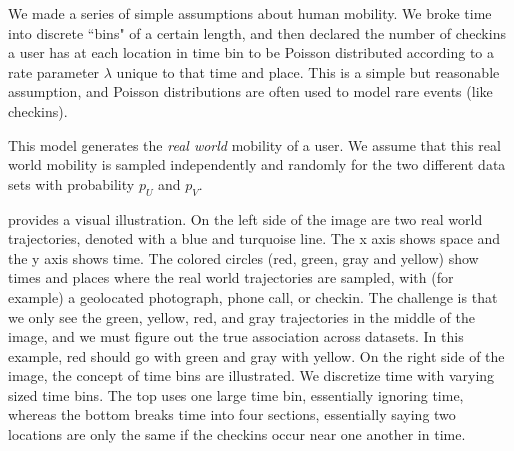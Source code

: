 We made a series of simple assumptions about human mobility.
We broke time into discrete ``bins" of a certain length, and then declared the number of checkins a user has at each location in time bin to be Poisson distributed according to a rate parameter $\lambda$ unique to that time and place.
This is a simple but reasonable assumption, and Poisson distributions are often used to model rare events (like checkins).

This model generates the \emph{real world} mobility of a user.
We assume that this real world mobility is sampled independently and randomly for the two different data sets with probability $p_U$ and $p_V$.

 provides a visual illustration.
On the left side of the image are two real world trajectories, denoted with a blue and turquoise line.
The x axis shows space and the y axis shows time.
The colored circles (red, green, gray and yellow) show times and places where the real world trajectories are sampled, with (for example) a geolocated photograph, phone call, or checkin.
The challenge is that we only see the green, yellow, red, and gray trajectories in the middle of the image, and we must figure out the true association across datasets.
In this example, red should go with green and gray with yellow.
On the right side of the image, the concept of time bins are illustrated.
We discretize time with varying sized time bins.
The top uses one large time bin, essentially ignoring time, whereas the bottom breaks time into four sections, essentially saying two locations are only the same if the checkins occur near one another in time.


